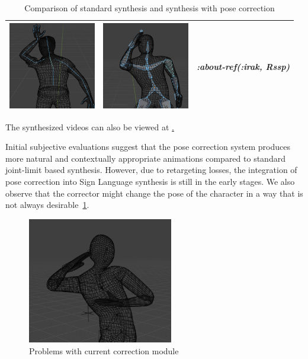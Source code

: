 \documentclass[../../main.tex]{subfiles}
\begin{document}
\begin{table}
\begin{tabular}{|c|c|c|}
    \includegraphics[width = 1.5in]{chapters/pose_correction/images/standard_synthesis_abt_ref_irak.png} & \includegraphics[width = 1.5in]{chapters/pose_correction/images/pose_correction_synthesis_abt_ref_irak.png} &
      \emph{:about-ref(:irak, Rssp)} \\
    \hline
  \end{tabular}
  \caption{Comparison of standard synthesis and synthesis with pose correction}
  \label{tab:results}
\end{table}

The synthesized videos can also be viewed at \href{todo}.

Initial subjective evaluations suggest that the pose correction system produces more natural and contextually appropriate animations compared to standard joint-limit based synthesis. However, due to retargeting losses, the integration of pose correction into Sign Language synthesis is still in the early stages. We also observe that the corrector might change the pose of the character in a way that is not always desirable~\ref{fig:problem_pose_correction}.

\begin{figure}
  \centering \includegraphics[width = 2.5in]{chapters/pose_correction/images/problem_pose_correction.png}
  \caption{Problems with current correction module}
  \label{fig:problem_pose_correction}
\end{figure}
\end{document}
